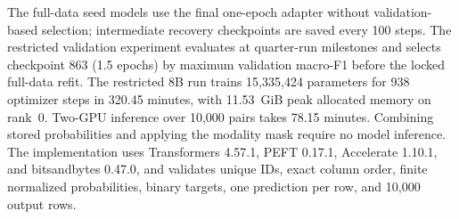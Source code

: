 \documentclass[11pt]{article}
\begin{document}
The full-data seed models use the final one-epoch adapter without validation-based selection; intermediate recovery checkpoints are saved every 100 steps.  The restricted validation experiment evaluates at quarter-run milestones and selects checkpoint 863 (1.5 epochs) by maximum validation macro-F1 before the locked full-data refit.  The restricted 8B run trains 15,335,424 parameters for 938 optimizer steps in 320.45 minutes, with 11.53~GiB peak allocated memory on rank~0.  Two-GPU inference over 10,000 pairs takes 78.15 minutes.  Combining stored probabilities and applying the modality mask require no model inference.  The implementation uses Transformers 4.57.1, PEFT 0.17.1, Accelerate 1.10.1, and bitsandbytes 0.47.0, and validates unique IDs, exact column order, finite normalized probabilities, binary targets, one prediction per row, and 10,000 output rows.
\end{document}
